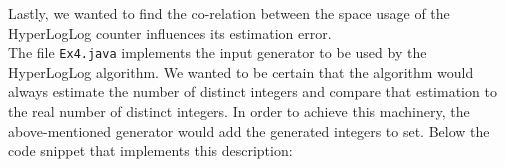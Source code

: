 \documentclass{tufte-handout}
\begin{document}




\noindent Lastly, we wanted to find the co-relation between the space usage of the HyperLogLog counter influences its estimation error.\\
\bigskip \noindent
The file {\tt Ex4.java} implements the input generator to be used by the HyperLogLog algorithm. We wanted to be certain that the algorithm would always estimate the number of distinct integers and compare that estimation to the real number of distinct integers. In order to achieve this machinery, the above-mentioned generator would add the generated integers to set. Below the code snippet that implements this description:
\end{document}
